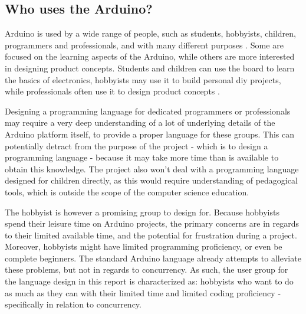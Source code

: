 \subsection{Who uses the Arduino?}\label{subsec:whouses}
Arduino is used by a wide range of people, such as students, hobbyists, children, programmers and professionals, and with many different purposes \cite{WhatArduino}. Some are focused on the learning aspects of the Arduino, while others are more interested in designing product concepts. Students and children can use the board to learn the basics of electronics, hobbyists may use it to build personal \gls{diy} projects, while professionals often use it to design product concepts \cite{WhatArduino}.

Designing a programming language for dedicated programmers or professionals may require a very deep understanding of a lot of underlying details of the Arduino platform itself, to provide a proper language for these groups. This can potentially detract from the purpose of the project - which is to design a programming language - because it may take more time than is available to obtain this knowledge. The project also won't deal with a programming language designed for children directly, as this would require understanding of pedagogical tools, which is outside the scope of the computer science education.

The hobbyist is however a promising group to design for. Because hobbyists spend their leisure time on Arduino projects, the primary concerns are in regards to their limited available time, and the potential for frustration during a project. Moreover, hobbyists might have limited programming proficiency, or even be complete beginners. The standard Arduino language already attempts to alleviate these problems, but not in regards to concurrency. As such, the user group for the language design in this report is characterized as: hobbyists who want to do as much as they can with their limited time and limited coding proficiency - specifically in relation to concurrency.
